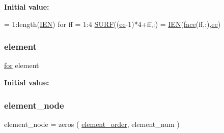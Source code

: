{\bfseries Initial value\+:}
\begin{DoxyCode}
= 1:length(\hyperlink{a00608_ab08108f8909c2d9138c9e93413f7b6b9}{IEN})
    \textcolor{keywordflow}{for} ff  = 1:4
        \hyperlink{a00611_acc2cee21ea7e7da5015e0957c291ff80}{SURF}((\hyperlink{a00611_af3a3092fbb5f170a7baecf75fd1b29d2}{ee}-1)*4+ff,:) = \hyperlink{a00608_ab08108f8909c2d9138c9e93413f7b6b9}{IEN}(\hyperlink{a00611_a9109c446b437fff787b51f7eb55988c3}{face}(ff,:),\hyperlink{a00611_af3a3092fbb5f170a7baecf75fd1b29d2}{ee})
\end{DoxyCode}
\mbox{\label{a00611_a4998e7f4989562d1ed06579e07265c30}} 
\subsubsection{\texorpdfstring{element}{element}}
{\footnotesize\ttfamily \hyperlink{a00623_ad1e7380d51df1e0043d24d3c8a860e0a}{for} element}

{\bfseries Initial value\+:}
\mbox{\label{a00611_a6e1aca963bebde79824bef83587803b7}} 
\subsubsection{\texorpdfstring{element\+\_\+node}{element\_node}}
{\footnotesize\ttfamily element\+\_\+node = zeros ( \hyperlink{a00611_aa77ee84ffb15118601acbd018f243edc}{element\+\_\+order}, element\+\_\+num )}

\mbox{\label{a00611_aa77ee84ffb15118601acbd018f243edc}} 
